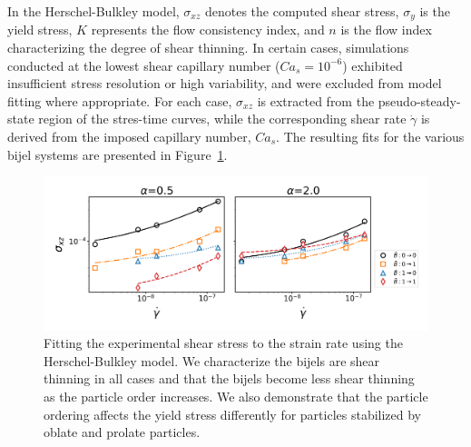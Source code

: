 In the Herschel-Bulkley model, $\sigma_{xz}$ denotes the computed shear stress, $\sigma_y$ is the yield stress, $K$ represents the flow consistency index, 
and $n$ is the flow index characterizing the degree of shear thinning. In certain cases, simulations conducted at the lowest shear capillary number 
($Ca_s = 10^{-6}$) exhibited insufficient stress resolution or high variability, and were excluded from model fitting where appropriate. For each case, 
$\sigma_{xz}$ is extracted from the pseudo-steady-state region of the stres-time curves, while the corresponding shear rate $\dot{\gamma}$ is derived from 
the imposed capillary number, $Ca_s$. The resulting fits for the various bijel systems are presented in Figure~\ref{fig:stress_strain}.

\begin{figure} 
    \centering 
    \includegraphics[scale=0.5]{../figures/results/paper3/stress_strain-all.png} 
    \caption{Fitting the experimental shear stress to the strain rate using the Herschel-Bulkley model. We characterize the bijels are 
             shear thinning in all cases and that the bijels become less shear thinning as the particle order increases. We also
             demonstrate that the particle ordering affects the yield stress differently for particles stabilized by oblate and 
             prolate particles.} 
    \label{fig:stress_strain} 
\end{figure}

